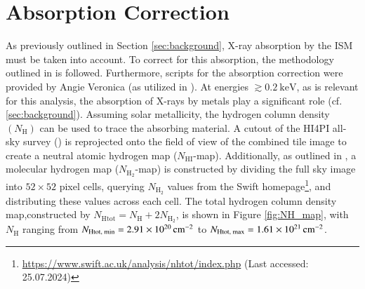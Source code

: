 \section{Absorption Correction}
As previously outlined in Section \ref{sec:background}, X-ray absorption by the ISM must be taken into account. To correct for this absorption, the methodology outlined in \citet{Reiprich2021} is followed. Furthermore, scripts for the absorption correction were provided by Angie Veronica (as utilized in \cite{veronica2020}). At energies \(\gtrsim \SI{0.2}{\kilo\electronvolt}\), as is relevant for this analysis, the absorption of X-rays by metals play a significant role (cf. \ref{sec:background}). 
Assuming solar metallicity, the hydrogen column density \({\textstyle (N_\text{H})}\) can be used to trace the absorbing material. A cutout of the HI4PI all-sky survey (\cite{HI4PI2016}) is reprojected onto the field of view of the combined tile image to create a neutral atomic hydrogen map (\({\textstyle N_{\text{HI}}}\)-map). Additionally, as outlined in \citet{Willingale2013}, a molecular hydrogen map (\({\textstyle N_{\text{H}_2}}\)-map) is constructed by dividing the full sky image into \(52 \times 52\) pixel cells, querying \({\textstyle N_{\text{H}_2}}\) values from the Swift homepage\footnote{\url{https://www.swift.ac.uk/analysis/nhtot/index.php} (Last accessed: 25.07.2024)}, and distributing these values across each cell. The total hydrogen column density map,constructed by \({\textstyle N_{\text{Htot}} = N_{\text{H}} + 2N_{\text{H}_2}}\), is shown in Figure \ref{fig:NH_map}, with \({\textstyle N_{\text{H}}}\) ranging from \({\textstyle N_\text{Htot, min} = \SI{2.91e+20}{{\centi\meter}^{-2}}}\) to \({\textstyle N_\text{Htot, max} = \SI{1.61e+21}{{\centi\meter}^{-2}}}\).

